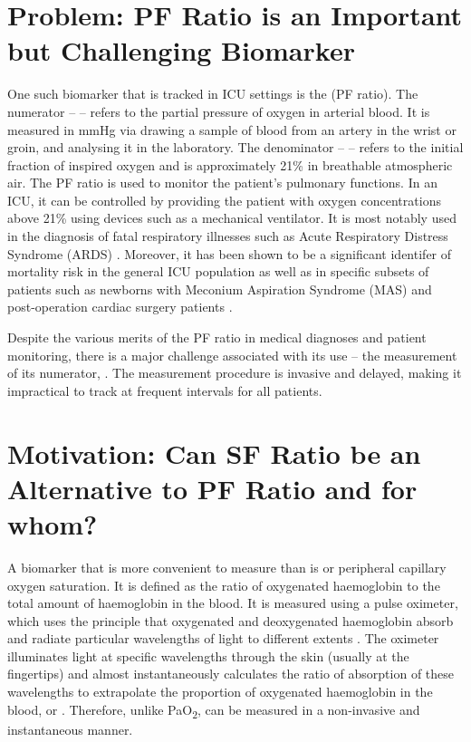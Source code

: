 \section{Problem: PF Ratio is an Important but Challenging Biomarker}

One such biomarker that is tracked in ICU settings is the  \PF(PF ratio). The numerator – \Pa – refers to the partial pressure of oxygen in arterial blood. It is measured in mmHg via drawing a sample of blood from an artery in the wrist or groin, and analysing it in the laboratory. The denominator – \Fi – refers to the initial fraction of inspired oxygen and is approximately 21\% in breathable atmospheric air. The PF ratio is used to monitor the patient's pulmonary functions. In an ICU, it can be controlled by providing the patient with oxygen concentrations above 21\% using devices such as a mechanical ventilator. It is most notably used in the diagnosis of fatal respiratory illnesses such as Acute Respiratory Distress Syndrome (ARDS) \citep{bernard1994american}. Moreover, it has been shown to be a significant identifer of mortality risk in the general ICU population \citep{villar2011risk} as well as in specific subsets of patients such as newborns with Meconium Aspiration Syndrome (MAS)  \citep{narayanan2019pao2} and post-operation cardiac surgery patients \citep{esteve2014evaluation}.

Despite the various merits of the PF ratio in medical diagnoses and patient monitoring, there is a major challenge associated with its use – the measurement of its numerator, \Pa. The \Pa measurement procedure is invasive and delayed, making it impractical to track \Pa at frequent intervals for all patients. 


\section{Motivation: Can SF Ratio be an Alternative to PF Ratio and for whom?}
A biomarker that is more convenient to measure than \Pa is \Sp or peripheral capillary oxygen saturation. It is defined as the ratio of oxygenated haemoglobin to the total amount of haemoglobin in the blood. It is measured using a pulse oximeter, which uses the principle that oxygenated and deoxygenated haemoglobin absorb and radiate particular wavelengths of light to different extents \citep{jubran1999pulse}. The oximeter illuminates light at specific wavelengths through the skin (usually at the fingertips) and almost instantaneously calculates the ratio of absorption of these wavelengths to extrapolate the proportion of oxygenated haemoglobin in the blood, or \Sp \citep{jubran2015}. Therefore, unlike PaO\textsubscript{2}, \Sp can be measured in a non-invasive and instantaneous manner. 

